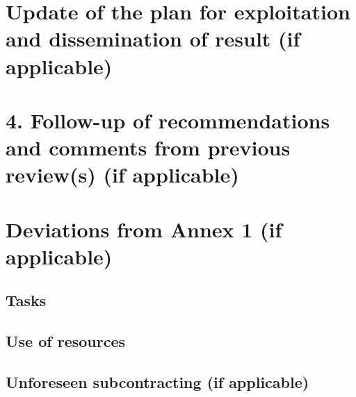 \documentclass{deliverablereport}
\begin{document}


\section{Update of the plan for exploitation and dissemination of result (if applicable)}



\section{4. Follow-up of recommendations and comments from previous review(s) (if applicable)}


\section{Deviations from Annex 1 (if applicable)}

\subsection{Tasks}


\subsection{Use of resources}

\subsection{Unforeseen subcontracting (if applicable)}

\end{document}
